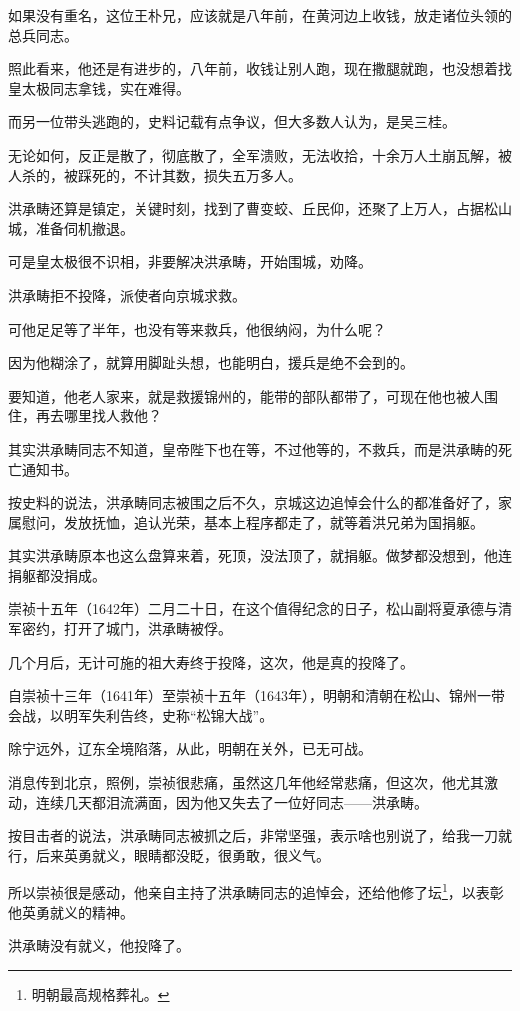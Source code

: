 \begin{multicols}{\theparacolNo}
如果没有重名，这位王朴兄，应该就是八年前，在黄河边上收钱，放走诸位头领的总兵同志。

照此看来，他还是有进步的，八年前，收钱让别人跑，现在撒腿就跑，也没想着找皇太极同志拿钱，实在难得。

而另一位带头逃跑的，史料记载有点争议，但大多数人认为，是吴三桂。

无论如何，反正是散了，彻底散了，全军溃败，无法收拾，十余万人土崩瓦解，被人杀的，被踩死的，不计其数，损失五万多人。

洪承畴还算是镇定，关键时刻，找到了曹变蛟、丘民仰，还聚了上万人，占据松山城，准备伺机撤退。

可是皇太极很不识相，非要解决洪承畴，开始围城，劝降。

洪承畴拒不投降，派使者向京城求救。

可他足足等了半年，也没有等来救兵，他很纳闷，为什么呢？

因为他糊涂了，就算用脚趾头想，也能明白，援兵是绝不会到的。

要知道，他老人家来，就是救援锦州的，能带的部队都带了，可现在他也被人围住，再去哪里找人救他？

其实洪承畴同志不知道，皇帝陛下也在等，不过他等的，不救兵，而是洪承畴的死亡通知书。

按史料的说法，洪承畴同志被围之后不久，京城这边追悼会什么的都准备好了，家属慰问，发放抚恤，追认光荣，基本上程序都走了，就等着洪兄弟为国捐躯。

其实洪承畴原本也这么盘算来着，死顶，没法顶了，就捐躯。做梦都没想到，他连捐躯都没捐成。

崇祯十五年（1642年）二月二十日，在这个值得纪念的日子，松山副将夏承德与清军密约，打开了城门，洪承畴被俘。

几个月后，无计可施的祖大寿终于投降，这次，他是真的投降了。

自崇祯十三年（1641年）至崇祯十五年（1643年），明朝和清朝在松山、锦州一带会战，以明军失利告终，史称“松锦大战”。

除宁远外，辽东全境陷落，从此，明朝在关外，已无可战。

消息传到北京，照例，崇祯很悲痛，虽然这几年他经常悲痛，但这次，他尤其激动，连续几天都泪流满面，因为他又失去了一位好同志——洪承畴。

按目击者的说法，洪承畴同志被抓之后，非常坚强，表示啥也别说了，给我一刀就行，后来英勇就义，眼睛都没眨，很勇敢，很义气。

所以崇祯很是感动，他亲自主持了洪承畴同志的追悼会，还给他修了坛\footnote{明朝最高规格葬礼。}，以表彰他英勇就义的精神。

洪承畴没有就义，他投降了。


\end{multicols}
